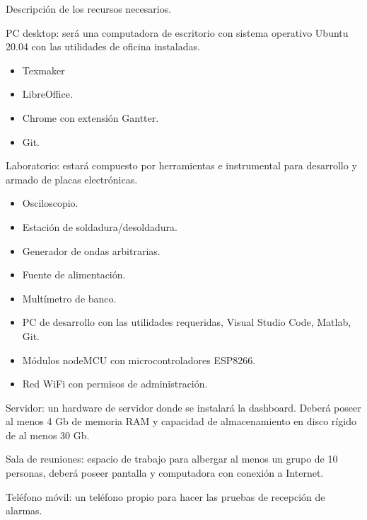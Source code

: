 \documentclass[11pt]{charter}
\begin{document}
Descripción de los recursos necesarios.

PC desktop: será una computadora de escritorio con sistema operativo Ubuntu 20.04 con las utilidades de oficina instaladas.
\begin{itemize}
\item Texmaker
\item LibreOffice.
\item Chrome con extensión Gantter.
\item Git.
\end{itemize}

Laboratorio: estará compuesto por herramientas e instrumental para desarrollo y armado de placas electrónicas.
\begin{itemize}
\item Osciloscopio.
\item Estación de soldadura/desoldadura.
\item Generador de ondas arbitrarias.
\item Fuente de alimentación.
\item Multímetro de banco.
\item PC de desarrollo con las utilidades requeridas, Visual Studio Code, Matlab, Git.
\item Módulos nodeMCU con microcontroladores ESP8266.
\item Red WiFi con permisos de administración.
\end{itemize}

Servidor: un hardware de servidor donde se instalará la dashboard. Deberá poseer al menos 4 Gb de memoria RAM y capacidad de almacenamiento en disco rígido de al menos 30 Gb. 

Sala de reuniones: espacio de trabajo para albergar al menos un grupo de 10 personas, deberá poseer pantalla y computadora con conexión a Internet.

Teléfono móvil: un teléfono propio para hacer las pruebas de recepción de alarmas.
\end{document}

